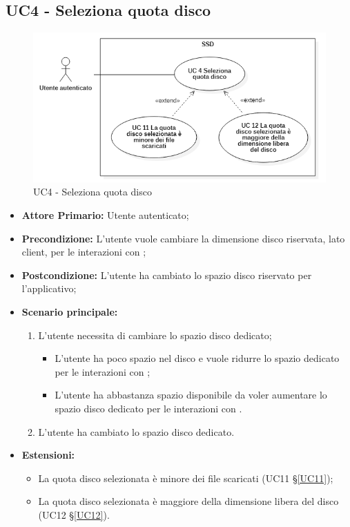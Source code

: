 \subsection{UC4 - Seleziona quota disco}
\label{UC4}
\begin{figure}[H]
    \centering
    \includegraphics[scale = 0.7]{components/img/UC4.png}
    \caption{UC4 - Seleziona quota disco}
\end{figure}
\begin{itemize}
\item \textbf{Attore Primario:} Utente autenticato;
\item \textbf{Precondizione:} L'utente vuole cambiare la dimensione disco riservata, lato client, per le interazioni con ;
\item \textbf{Postcondizione:} L'utente ha cambiato lo spazio disco riservato per l'applicativo;
\item \textbf{Scenario principale:}
    \begin{enumerate}
    \item L'utente necessita di cambiare lo spazio disco dedicato;
        \begin{itemize}
        \item L'utente ha poco spazio nel disco e vuole ridurre lo spazio dedicato per le interazioni con ;
        \item L'utente ha abbastanza spazio disponibile da voler aumentare lo spazio disco dedicato per le interazioni con .
        \end{itemize}
    \item L'utente ha cambiato lo spazio disco dedicato.
    \end{enumerate}
\item \textbf{Estensioni:}
    \begin{itemize}
        \item La quota disco selezionata è minore dei file scaricati (UC11 \S{}\ref{UC11});
        \item La quota disco selezionata è maggiore della dimensione libera del disco (UC12 \S{}\ref{UC12}).
    \end{itemize}
\end{itemize}